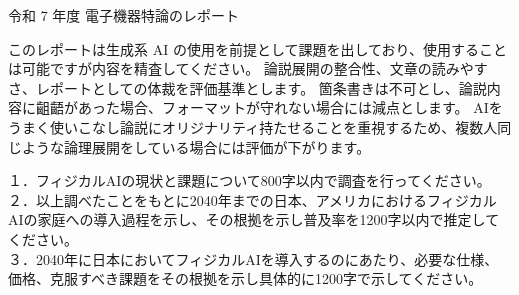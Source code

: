 \documentclass[lualatex,ja=standard,a4paper,11pt]{bxjsarticle}
\begin{document}
\begin{center}
{\Large 令和 7 年度 電子機器特論のレポート}
\end{center}

このレポートは生成系 AI の使用を前提として課題を出しており、使用することは可能ですが内容を精査してください。
論説展開の整合性、文章の読みやすさ、レポートとしての体裁を評価基準とします。
箇条書きは不可とし、論説内容に齟齬があった場合、フォーマットが守れない場合には減点とします。
AIをうまく使いこなし論説にオリジナリティ持たせることを重視するため、複数人同じような論理展開をしている場合には評価が下がります。

\noindent
１．フィジカルAIの現状と課題について800字以内で調査を行ってください。\\


\noindent
２．以上調べたことをもとに2040年までの日本、アメリカにおけるフィジカルAIの家庭への導入過程を示し、その根拠を示し普及率を1200字以内で推定してください。\\

\noindent
３．2040年に日本においてフィジカルAIを導入するのにあたり、必要な仕様、価格、克服すべき課題をその根拠を示し具体的に1200字で示してください。


\end{document}
